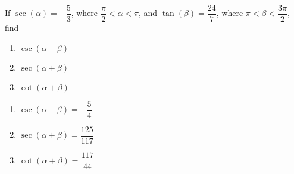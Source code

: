 {If $\sec(\alpha) = -\dfrac{5}{3}$, where $\dfrac{\pi}{2} < \alpha < \pi$, and $\tan(\beta) = \dfrac{24}{7}$, where $\pi < \beta < \dfrac{3\pi}{2}$, find

\begin{enumerate}
\item $\csc(\alpha - \beta)$
\item $\sec(\alpha + \beta)$
\item $\cot(\alpha + \beta)$
\end{enumerate}
}
{
\begin{enumerate}
\item $\csc(\alpha - \beta) = -\dfrac{5}{4}$
\item $\sec(\alpha + \beta) = \dfrac{125}{117}$
\item $\cot(\alpha + \beta) = \dfrac{117}{44}$
\end{enumerate}
}